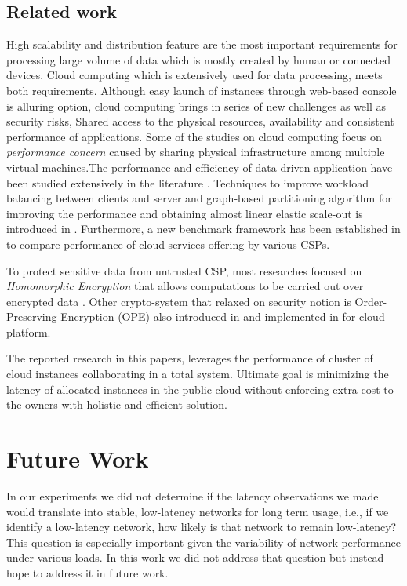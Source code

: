 \subsection{Related work}
\label{sec:relatedWork}
High scalability and distribution feature are the most important requirements for processing large volume of data which is mostly created by human or connected devices. Cloud computing which is extensively used for data processing, meets both requirements. Although easy launch of instances through web-based console is alluring option, cloud computing brings in series of new challenges as well as security risks, Shared access to the physical resources, availability and consistent performance of applications. Some of the studies on cloud computing focus on {\it performance concern} caused by sharing physical infrastructure among multiple virtual machines.The performance and efficiency of data-driven application have been studied extensively in the literature \cite{hacigumus2002providing, curino2011relational, cooper2010benchmarking}. Techniques to improve workload balancing between clients and server and graph-based partitioning algorithm for improving the performance and obtaining almost linear elastic scale-out is introduced in \cite{curino2011relational}. Furthermore, a new benchmark framework has been established in \cite{cooper2010benchmarking} to compare performance of cloud services offering by various CSPs.

To protect sensitive data from untrusted CSP, most researches focused on {\it Homomorphic Encryption} that allows computations to be carried out over encrypted data \cite{gentry2009fully}. Other crypto-system that relaxed on security notion is Order-Preserving Encryption (OPE) also introduced in \cite{boldyreva2009order} and implemented in \cite{ahmadian2014security,ahmadian2015security} for cloud platform. 

The reported research in this papers, leverages the performance of cluster of cloud instances collaborating in a total system. Ultimate goal is minimizing the latency of allocated instances in the public cloud without enforcing extra cost to the owners with holistic and efficient solution.

\section{Future Work} \label{sec:futurework}

In our experiments we did not determine if the latency observations we made would  translate into stable, low-latency networks for long term usage, i.e., if we identify a low-latency network, how likely is that network to remain low-latency? This question is especially important given the variability of network performance under various loads. In this work we did not address that question but instead hope to address it in future work. 

